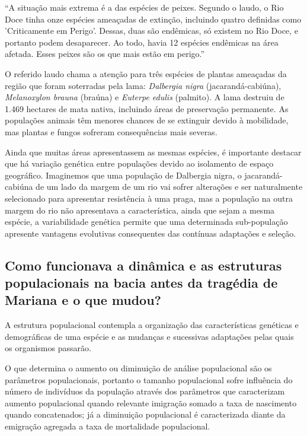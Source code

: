 \documentclass[
article,			%
11pt,				%
oneside,			%
a4paper,			%
english,			%
brazil,				%
sumario=tradicional
]{abntex2}
\begin{document}
	\begin{citacao}
		``A situação mais extrema é a das espécies de peixes. Segundo o laudo, o Rio Doce tinha onze espécies ameaçadas de extinção, incluindo quatro definidas como 'Criticamente em Perigo'. Dessas, duas são endêmicas, só existem no Rio Doce, e portanto podem desaparecer. Ao todo, havia 12 espécies endêmicas na área afetada. Esses peixes são os que mais estão em perigo.'' \cite{calixto2016a}
	\end{citacao}
	
	O referido laudo chama a atenção para três espécies de plantas ameaçadas da região que foram soterradas pela lama: \textit{Dalbergia nigra} (jacarandá-cabiúna), \textit{Melanoxylon brauna} (braúna) e \textit{Euterpe edulis} (palmito). A lama destruiu de 1.469 hectares de mata nativa, incluindo áreas de preservação permanente. As populações animais têm menores chances de se extinguir devido à mobilidade, mas plantas e fungos sofreram consequências mais severas.
	
	Ainda que muitas áreas apresentassem as mesmas espécies, é importante destacar que há variação genética entre populações devido ao isolamento de espaço geográfico. Imaginemos que uma população de Dalbergia nigra, o jacarandá-cabiúna de um lado da margem de um rio vai sofrer alterações e ser naturalmente selecionado para apresentar resistência à uma praga, mas a população na outra margem do rio não apresentava a característica, ainda que sejam a mesma espécie, a variabilidade genética permite que uma determinada sub-população apresente vantagens evolutivas consequentes das contínuas adaptações e seleção.
	
	\subsection{Como funcionava a dinâmica e as estruturas populacionais na bacia antes da tragédia de Mariana e o que mudou?} \label{ss:dinamica}
	
	A estrutura populacional contempla a organização das características genéticas e demográficas de uma espécie e as mudanças e sucessivas adaptações pelas quais os organismos passarão.
	
	O que determina o aumento ou diminuição de análise populacional são os parâmetros populacionais, portanto o tamanho populacional sofre influência do número de indivíduos da população através dos parâmetros que caracterizam aumento populacional quando relevante imigração somado a taxa de nascimento quando concatenados; já a diminuição populacional é caracterizada diante da emigração agregada a taxa de mortalidade populacional.
	
\end{document}

